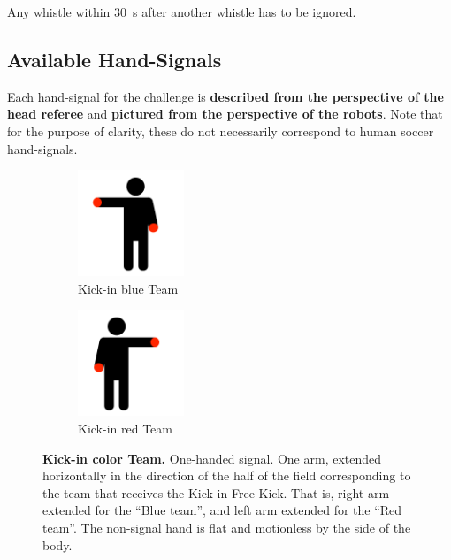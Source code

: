 Any whistle within \qty{30}{\second} after another whistle has to be ignored.

\subsection{Available Hand-Signals}

Each hand-signal for the challenge is \textbf{described from the perspective of the head referee} and \textbf{pictured from the perspective of the robots}. Note that for the purpose of clarity, these do not necessarily correspond to human soccer hand-signals.

\begin{figure}[ht!]
    \centering
    \begin{subfigure}{.33\textwidth}
        \centering
        \includegraphics[height=120px]{figs/technical_challenges/kick-in.png}
        \caption{\color{blue}Kick-in \textlangle{}blue\textrangle{} Team}
    \end{subfigure}
    \begin{subfigure}{.33\textwidth}
        \centering
        \includegraphics[height=120px]{figs/technical_challenges/kick-in-flipped.png}
        \caption{\color{red}Kick-in \textlangle{}red\textrangle{} Team}
    \end{subfigure}
    \caption{\textbf{Kick-in \textlangle{}color\textrangle{} Team.} One-handed signal. One arm, extended horizontally in the direction of the half of the field corresponding to the team that receives the Kick-in Free Kick. That is, right arm extended for the ``Blue team'', and left arm extended for the ``Red team''. The non-signal hand is flat and motionless by the side of the body.}
\end{figure}
    
